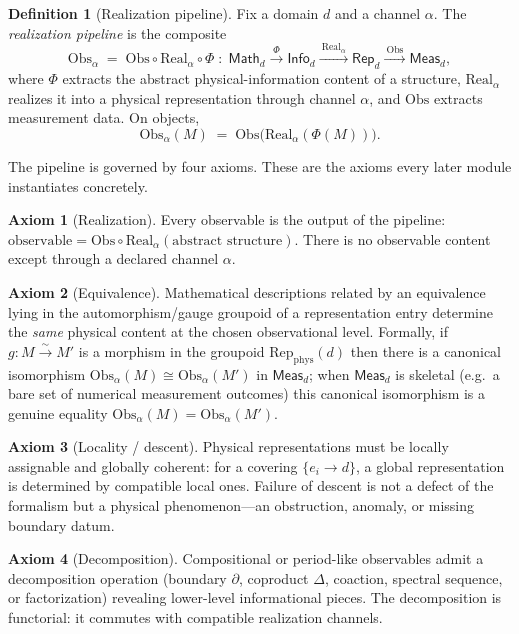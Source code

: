 \documentclass[12pt]{article}
\theoremstyle{definition}
\newtheorem{definition}[theorem]{Definition}
\newtheorem{axiom}{Axiom}
\theoremstyle{remark}
\newcommand{\Math}{\mathsf{Math}}
\newcommand{\Info}{\mathsf{Info}}
\newcommand{\Rep}{\mathsf{Rep}}
\newcommand{\Meas}{\mathsf{Meas}}
\newcommand{\Real}{\mathrm{Real}}
\newcommand{\Obs}{\mathrm{Obs}}
\newcommand{\Repphys}{\mathrm{Rep}_{\mathrm{phys}}}
\begin{document}
\begin{definition}[Realization pipeline]
\label{def:pipeline}
Fix a domain $d$ and a channel $\alpha$. The \emph{realization pipeline} is the
composite
\[
  \Obs_\alpha \;=\; \Obs \circ \Real_\alpha \circ \Phi \;:\;
  \Math_d \xrightarrow{\ \Phi\ } \Info_d \xrightarrow{\ \Real_\alpha\ }
  \Rep_d \xrightarrow{\ \Obs\ } \Meas_d,
\]
where $\Phi$ extracts the abstract physical-information content of a structure,
$\Real_\alpha$ realizes it into a physical representation through channel
$\alpha$, and $\Obs$ extracts measurement data. On objects,
\[
  \Obs_\alpha(M) \;=\; \Obs\bigl(\Real_\alpha(\Phi(M))\bigr).
\]
\end{definition}

The pipeline is governed by four axioms. These are the axioms every later module
instantiates concretely.

\begin{axiom}[Realization]
\label{ax:real}
Every observable is the output of the pipeline:
$\text{observable} = \Obs \circ \Real_\alpha(\text{abstract structure})$. There
is no observable content except through a declared channel $\alpha$.
\end{axiom}

\begin{axiom}[Equivalence]
\label{ax:equiv}
Mathematical descriptions related by an equivalence lying in the
automorphism/gauge groupoid of a representation entry determine the \emph{same}
physical content at the chosen observational level. Formally, if
$g : M \xrightarrow{\sim} M'$ is a morphism in the groupoid $\Repphys(d)$ then
there is a canonical isomorphism $\Obs_\alpha(M) \cong \Obs_\alpha(M')$ in
$\Meas_d$; when $\Meas_d$ is skeletal (e.g.\ a bare set of numerical measurement
outcomes) this canonical isomorphism is a genuine equality
$\Obs_\alpha(M) = \Obs_\alpha(M')$.
\end{axiom}

\begin{axiom}[Locality / descent]
\label{ax:local}
Physical representations must be locally assignable and globally coherent: for a
covering $\{e_i \to d\}$, a global representation is determined by compatible
local ones. Failure of descent is not a defect of the formalism but a physical
phenomenon---an obstruction, anomaly, or missing boundary datum.
\end{axiom}

\begin{axiom}[Decomposition]
\label{ax:decomp}
Compositional or period-like observables admit a decomposition operation
(boundary $\partial$, coproduct $\Delta$, coaction, spectral sequence, or
factorization) revealing lower-level informational pieces. The decomposition is
functorial: it commutes with compatible realization channels.
\end{axiom}
\end{document}

